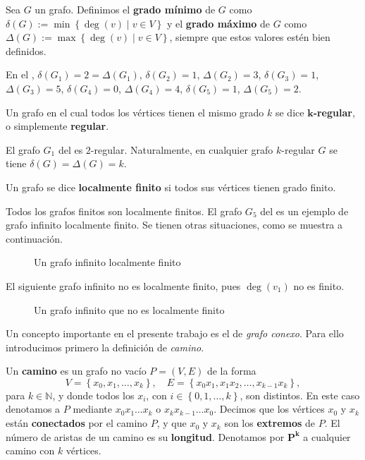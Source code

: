 \begin{Def}
   Sea $G$ un grafo. Definimos el \textbf{grado mínimo} de $G$ como $\delta (G):= \min \left\lbrace \operatorname{deg}(v)\mid v\in V\right\rbrace$ y el \textbf{grado máximo} de $G$ como $\Delta (G):= \max \left\lbrace \operatorname{deg}(v)\mid v\in V\right\rbrace$, siempre que estos valores estén bien definidos.
\end{Def}
En el , $\delta (G_1)=2=\Delta (G_1)$, $\delta (G_2)=1$, $\Delta (G_2)=3$, $\delta (G_3)=1$, $\Delta (G_3)=5$, $\delta (G_4)=0$, $\Delta (G_4)=4$, $\delta (G_5)=1$, $\Delta (G_5)=2$.
\begin{Def}
   Un grafo en el cual todos los vértices tienen el mismo grado $k$ se dice $\boldsymbol{k}$\textbf{-regular}, o simplemente \textbf{regular}.
\end{Def}
El grafo $G_1$ del  es $2$-regular. Naturalmente, en cualquier grafo $k$-regular $G$ se tiene $\delta(G)=\Delta(G)=k$.
\begin{Def}
   Un grafo se dice \textbf{localmente finito} si todos sus vértices tienen grado finito. 
\end{Def}
Todos los grafos finitos son localmente finitos. El grafo $G_5$ del  es un ejemplo de grafo infinito localmente finito. Se tienen otras situaciones, como se muestra a continuación.
\begin{Ejm}
   \phantom{o}
   \begin{figure}[H]
     \centering
       \resizebox{0.4\textwidth}{!}{} 
     \caption{Un grafo infinito localmente finito}
   \end{figure}
\end{Ejm}
\begin{Ejm}
   El siguiente grafo infinito no es localmente finito, pues $\operatorname{deg}(v_1)$ no es finito.
   \begin{figure}[H]
     \centering
       \resizebox{0.45\textwidth}{!}{} 
     \caption{Un grafo infinito que no es localmente finito}
   \end{figure}
\end{Ejm}
Un concepto importante en el presente trabajo es el de \textit{grafo conexo}. Para ello introducimos primero la definición de \textit{camino}.
\begin{Def}
   Un \textbf{camino} es un grafo no vacío $P=(V,E)$ de la forma
   $$
   V=\left\lbrace x_0, x_1, \dots, x_k\right\rbrace, \quad E=\left\lbrace x_0x_1, x_1x_2, \dots , x_{k-1}x_k\right\rbrace,
   $$
   para $k\in \mathbb{N}$, y donde todos los $x_i$, con $i\in \left\lbrace 0,1,\dots,k\right\rbrace$, son distintos. En este caso denotamos a $P$ mediante $x_0x_1\dots x_k$ o $x_kx_{k-1}\dots x_0$. Decimos que los vértices $x_0$ y $x_k$ están \textbf{conectados} por el camino $P$, y que $x_0$ y $x_k$ son los \textbf{extremos} de $P$. El número de aristas de un camino es su \textbf{longitud}. Denotamos por $\bm{P^k}$ a cualquier camino con $k$ vértices.
\end{Def}
